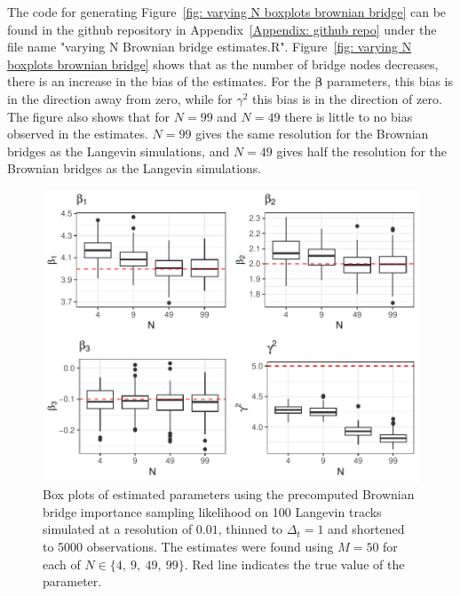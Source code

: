 The code for generating Figure~\ref{fig: varying N boxplots brownian bridge} can be found in the github repository in Appendix~\ref{Appendix: github repo} under the file name "varying N Brownian bridge estimates.R". Figure~\ref{fig: varying N boxplots brownian bridge} shows that as the number of bridge nodes decreases, there is an increase in the bias of the estimates. For the $\bm \beta$ parameters, this bias is in the direction away from zero, while for $\gamma^2$ this bias is in the direction of zero. The figure also shows that for $N=99$ and $N=49$ there is little to no bias observed in the estimates. $N = 99$ gives the same resolution for the Brownian bridges as the Langevin simulations, and $N=49$ gives half the resolution for the Brownian bridges as the Langevin simulations.

\begin{figure}[H]
    \centering
    \includegraphics[width=\linewidth]{Images/Results/varying N estimates precomputed BB.pdf}
    \caption[Box plots of Parameter Estimates using precomputed Brownian bridge importance sampling using different numbers of bridge nodes]{Box plots of estimated parameters using the precomputed Brownian bridge importance sampling likelihood on 100 Langevin tracks simulated at a resolution of $0.01$, thinned to $\Delta_t = 1$ and shortened to 5000 observations. The estimates were found using $M=50$ for each of $N \in \{4 , \ 9, \ 49, \ 99\}$. Red line indicates the true value of the parameter.}
    \label{fig: varying N boxplots precomputed brownian bridge}
\end{figure}

